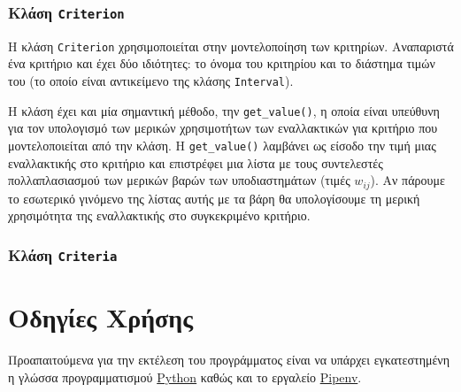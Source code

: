 \documentclass[11pt,a4paper,titlepage]{article}
\numberwithin{equation}{section}
\begin{document}
\subsubsection{Κλάση \texttt{Criterion}}
\label{sssec:Criterion}
Η κλάση \texttt{Criterion} χρησιμοποιείται στην μοντελοποίηση των κριτηρίων. Αναπαριστά ένα κριτήριο και έχει δύο ιδιότητες: το όνομα του κριτηρίου και το διάστημα τιμών του (το οποίο είναι αντικείμενο της κλάσης \texttt{Interval}).

Η κλάση έχει και μία σημαντική μέθοδο, την \texttt{get\_value()}, η οποία είναι υπεύθυνη για τον υπολογισμό των μερικών χρησιμοτήτων των εναλλακτικών για κριτήριο που μοντελοποιείται από την κλάση. Η \texttt{get\_value()} λαμβάνει ως είσοδο την τιμή μιας εναλλακτικής στο κριτήριο και επιστρέφει μια λίστα με τους συντελεστές πολλαπλασιασμού των μερικών βαρών των υποδιαστημάτων (τιμές $ w_{ij} $). Αν πάρουμε το εσωτερικό γινόμενο της λίστας αυτής με τα βάρη θα υπολογίσουμε τη μερική χρησιμότητα της εναλλακτικής στο συγκεκριμένο κριτήριο.

\subsubsection{Κλάση \texttt{Criteria}}
\label{sssec:Criteria}


\section{Οδηγίες Χρήσης}
\label{sec:6}

Προαπαιτούμενα για την εκτέλεση του προγράμματος είναι να υπάρχει εγκατεστημένη η γλώσσα προγραμματισμού \href{https://www.python.org/downloads/}{Python} καθώς και το εργαλείο \href{https://pipenv.pypa.io/en/latest/install/}{Pipenv}.
\end{document}
